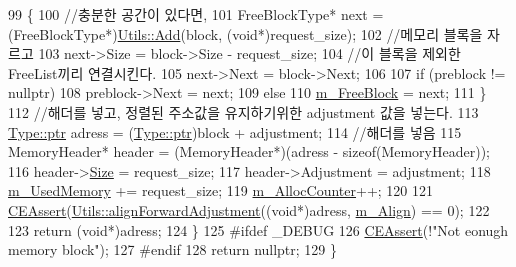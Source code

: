 \begin{DoxyCode}
99         \{
100             \textcolor{comment}{//충분한 공간이 있다면,}
101             FreeBlockType* next = (FreeBlockType*)\hyperlink{namespace_comet_engine_1_1_core_1_1_memory_1_1_utils_a93ae170a43dac9da0116187242b35a6f}{Utils::Add}(block, (\textcolor{keywordtype}{void}*)request\_size);
102             \textcolor{comment}{//메모리 블록을 자르고}
103             next->Size = block->Size - request\_size;
104             \textcolor{comment}{//이 블록을 제외한 FreeList끼리 연결시킨다.}
105             next->Next = block->Next;
106 
107             \textcolor{keywordflow}{if} (preblock != \textcolor{keyword}{nullptr})
108                 preblock->Next = next;
109             \textcolor{keywordflow}{else}
110                 \hyperlink{class_comet_engine_1_1_core_1_1_memory_1_1_free_list_allocator_a9e6f8b10d6e94738d154d9f7c72d2538}{m\_FreeBlock} = next;
111         \}
112         \textcolor{comment}{//해더를 넣고, 정렬된 주소값을 유지하기위한 adjustment 값을 넣는다.}
113         \hyperlink{namespace_comet_engine_1_1_type_aeb22ad46de677e9a50679dfebeb0e6f0}{Type::ptr} adress = (\hyperlink{namespace_comet_engine_1_1_type_aeb22ad46de677e9a50679dfebeb0e6f0}{Type::ptr})block + adjustment;
114         \textcolor{comment}{//해더를 넣음}
115         MemoryHeader* header = (MemoryHeader*)(adress - \textcolor{keyword}{sizeof}(MemoryHeader));
116         header->\hyperlink{struct_comet_engine_1_1_core_1_1_memory_1_1_free_list_allocator_1_1_free_block_type_ae6cf85bdf7b52a990d4428449e599c8e}{Size} = request\_size;
117         header->Adjustment = adjustment;
118         \hyperlink{class_comet_engine_1_1_core_1_1_memory_1_1_base_allocator_a1420047b91508f9ab33c448e8371511c}{m\_UsedMemory} += request\_size;
119         \hyperlink{class_comet_engine_1_1_core_1_1_memory_1_1_base_allocator_abed7f06b465ee178701fe2cfc1aff9a6}{m\_AllocCounter}++;
120 
121         \hyperlink{_comet_engine_types_8h_a9ade07b7881f4aeffa184676c123b87c}{CEAssert}(\hyperlink{namespace_comet_engine_1_1_core_1_1_memory_1_1_utils_aa5a0140d498d631a747be87791063f2d}{Utils::alignForwardAdjustment}((\textcolor{keywordtype}{void}*)adress, 
      \hyperlink{class_comet_engine_1_1_core_1_1_memory_1_1_base_allocator_a01f973630e3c1ac98b9defda193793b8}{m\_Align}) == 0);
122 
123         \textcolor{keywordflow}{return} (\textcolor{keywordtype}{void}*)adress;
124     \}
125 \textcolor{preprocessor}{#ifdef \_DEBUG}
126     \hyperlink{_comet_engine_types_8h_a9ade07b7881f4aeffa184676c123b87c}{CEAssert}(!\textcolor{stringliteral}{"Not eonugh memory block"});
127 \textcolor{preprocessor}{#endif}
128     \textcolor{keywordflow}{return} \textcolor{keyword}{nullptr};
129 \}
\end{DoxyCode}
